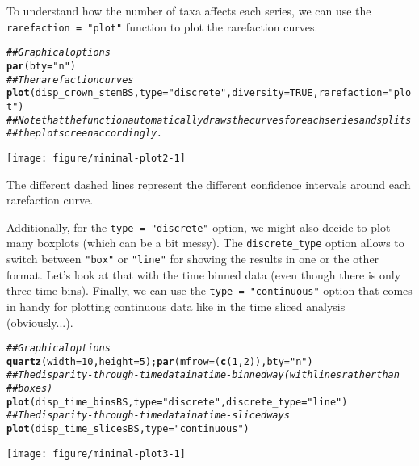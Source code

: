 \documentclass{article}\usepackage[]{graphicx}\usepackage[]{color}
\makeatletter
\newcommand{\hlnum}[1]{\textcolor[rgb]{0.686,0.059,0.569}{#1}}%
\newcommand{\hlstr}[1]{\textcolor[rgb]{0.192,0.494,0.8}{#1}}%
\newcommand{\hlcom}[1]{\textcolor[rgb]{0.678,0.584,0.686}{\textit{#1}}}%
\newcommand{\hlstd}[1]{\textcolor[rgb]{0.345,0.345,0.345}{#1}}%
\newcommand{\hlkwc}[1]{\textcolor[rgb]{0.333,0.667,0.333}{#1}}%
\newcommand{\hlkwd}[1]{\textcolor[rgb]{0.737,0.353,0.396}{\textbf{#1}}}%
\newenvironment{kframe}{%
 \def\at@end@of@kframe{}%
 \ifinner\ifhmode%
  \def\at@end@of@kframe{\end{minipage}}%
  \begin{minipage}{\columnwidth}%
 \fi\fi%
 \def\FrameCommand##1{\hskip\@totalleftmargin \hskip-\fboxsep
 \colorbox{shadecolor}{##1}\hskip-\fboxsep
     \hskip-\linewidth \hskip-\@totalleftmargin \hskip\columnwidth}%
 \MakeFramed {\advance\hsize-\width
   \@totalleftmargin\z@ \linewidth\hsize
   \@setminipage}}%
 {\par\unskip\endMakeFramed%
 \at@end@of@kframe}
\newenvironment{knitrout}{}{} %
\makeatother
\begin{document}
To understand how the number of taxa affects each series, we can use the \texttt{rarefaction = "plot"} function to plot the rarefaction curves.

\begin{knitrout}
\color{fgcolor}\begin{kframe}
\begin{alltt}
\hlcom{## Graphical options}
\hlkwd{par}\hlstd{(}\hlkwc{bty} \hlstd{=} \hlstr{"n"}\hlstd{)}
\hlcom{## The rarefaction curves}
\hlkwd{plot}\hlstd{(disp_crown_stemBS,} \hlkwc{type} \hlstd{=} \hlstr{"discrete"}\hlstd{,} \hlkwc{diversity} \hlstd{=} \hlnum{TRUE}\hlstd{,} \hlkwc{rarefaction} \hlstd{=} \hlstr{"plot"}\hlstd{)}
\hlcom{## Note that the function automatically draws the curves for each series and splits}
\hlcom{## the plot screen accordingly.}
\end{alltt}
\end{kframe}

{\centering \texttt{[image: figure/minimal-plot2-1]} 

}



\end{knitrout}

The different dashed lines represent the different confidence intervals around each rarefaction curve.

Additionally, for the \texttt{type = "discrete"} option, we might also decide to plot many boxplots (which can be a bit messy).
The \texttt{discrete\_type} option allows to switch between \texttt{"box"} or \texttt{"line"} for showing the results in one or the other format.
Let's look at that with the time binned data (even though there is only three time bins).
Finally, we can use the \texttt{type = "continuous"} option that comes in handy for plotting continuous data like in the time sliced analysis (obviously...).


\begin{knitrout}
\color{fgcolor}\begin{kframe}
\begin{alltt}
\hlcom{## Graphical options}
\hlkwd{quartz}\hlstd{(}\hlkwc{width} \hlstd{=} \hlnum{10}\hlstd{,} \hlkwc{height} \hlstd{=} \hlnum{5}\hlstd{) ;} \hlkwd{par}\hlstd{(}\hlkwc{mfrow} \hlstd{= (}\hlkwd{c}\hlstd{(}\hlnum{1}\hlstd{,}\hlnum{2}\hlstd{)),} \hlkwc{bty} \hlstd{=} \hlstr{"n"}\hlstd{)}
\hlcom{## The disparity-through-time data in a time-binned way (with lines rather than}
\hlcom{## boxes)}
\hlkwd{plot}\hlstd{(disp_time_binsBS,} \hlkwc{type} \hlstd{=} \hlstr{"discrete"}\hlstd{,} \hlkwc{discrete_type} \hlstd{=} \hlstr{"line"}\hlstd{)}
\hlcom{## The disparity-through-time data in a time-sliced ways}
\hlkwd{plot}\hlstd{(disp_time_slicesBS,} \hlkwc{type} \hlstd{=} \hlstr{"continuous"}\hlstd{)}
\end{alltt}
\end{kframe}

{\centering \texttt{[image: figure/minimal-plot3-1]} 

}



\end{knitrout}
\end{document}
